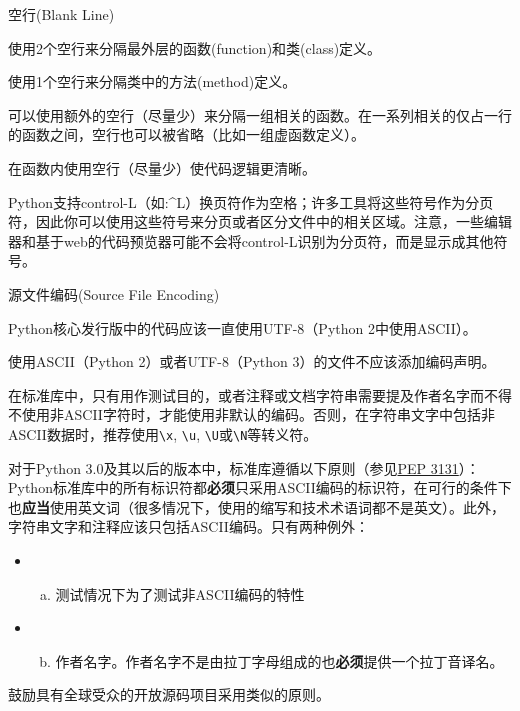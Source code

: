 \documentclass[ignorenonframetext,9pt]{beamer}
\providecommand{\tightlist}{%
  \setlength{\itemsep}{0pt}\setlength{\parskip}{0pt}}
\begin{document}
\begin{frame}{空行(Blank Line)}

\begin{block}

使用2个空行来分隔最外层的函数(function)和类(class)定义。

使用1个空行来分隔类中的方法(method)定义。

可以使用额外的空行（尽量少）来分隔一组相关的函数。在一系列相关的仅占一行的函数之间，空行也可以被省略（比如一组虚函数定义）。

在函数内使用空行（尽量少）使代码逻辑更清晰。

Python支持control-L（如:\^{}L）换页符作为空格；许多工具将这些符号作为分页符，因此你可以使用这些符号来分页或者区分文件中的相关区域。注意，一些编辑器和基于web的代码预览器可能不会将control-L识别为分页符，而是显示成其他符号。

\end{block}

\end{frame}

\begin{frame}[fragile]{源文件编码(Source File Encoding)}

\begin{block}

Python核心发行版中的代码应该一直使用UTF-8（Python 2中使用ASCII）。

使用ASCII（Python 2）或者UTF-8（Python 3）的文件不应该添加编码声明。

在标准库中，只有用作测试目的，或者注释或文档字符串需要提及作者名字而不得不使用非ASCII字符时，才能使用非默认的编码。否则，在字符串文字中包括非ASCII数据时，推荐使用\texttt{\textbackslash{}x},
\texttt{\textbackslash{}u},
\texttt{\textbackslash{}U}或\texttt{\textbackslash{}N}等转义符。

对于Python
3.0及其以后的版本中，标准库遵循以下原则（参见\href{https://www.python.org/dev/peps/pep-3131}{PEP
3131}）：Python标准库中的所有标识符都\textbf{必须}只采用ASCII编码的标识符，在可行的条件下也\textbf{应当}使用英文词（很多情况下，使用的缩写和技术术语词都不是英文）。此外，字符串文字和注释应该只包括ASCII编码。只有两种例外：

\begin{itemize}
\item
  \begin{enumerate}
  [(a)]
  \tightlist
  \item
    测试情况下为了测试非ASCII编码的特性
  \end{enumerate}
\item
  \begin{enumerate}
  [(a)]
  \setcounter{enumi}{1}
  \tightlist
  \item
    作者名字。作者名字不是由拉丁字母组成的也\textbf{必须}提供一个拉丁音译名。
  \end{enumerate}
\end{itemize}

鼓励具有全球受众的开放源码项目采用类似的原则。

\end{block}

\end{frame}
\end{document}
